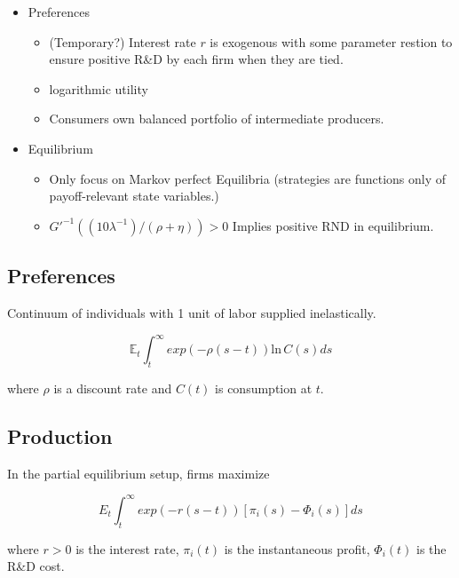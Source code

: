 \documentclass[11pt]{article}
\begin{document}
\begin{itemize}
    \item Preferences
    \begin{itemize}
      \item (Temporary?) Interest rate $r$ is exogenous with some parameter restion to ensure positive R\&D by each firm when they are tied.
      \item logarithmic utility
      \item Consumers own balanced portfolio of intermediate producers. 
    \end{itemize}
    
    \item Equilibrium
    \begin{itemize}
      \item Only focus on Markov perfect Equilibria (strategies are functions only of payoff-relevant state variables.)
      \item $G'^{-1}((1 0 \lambda^{-1}) / (\rho + \eta)) > 0$ Implies positive RND in equilibrium.
    \end{itemize}
    
  \end{itemize}

\subsection{Preferences}
\label{sub:preferences}

  Continuum of individuals with 1 unit of labor supplied inelastically.

  \begin{equation} \label{eq:pref}
    \mathbb{E}_t \int_t^\infty exp(-\rho(s - t))\mathrm{ln}\,   C(s)ds
  \end{equation}

  where $\rho$ is a discount rate and $C(t)$ is consumption at $t$.

\subsection{Production}
\label{sub:production}

  In the partial equilibrium setup, firms maximize

  \begin{equation}
    E_t \int_t^\infty exp(-r(s - t))[\pi_i(s) - \Phi_i(s)]ds
  \end{equation}

  where $r > 0$ is the interest rate, $\pi_i(t)$ is the instantaneous profit, $\Phi_i(t)$ is the R\&D cost.
\end{document}
